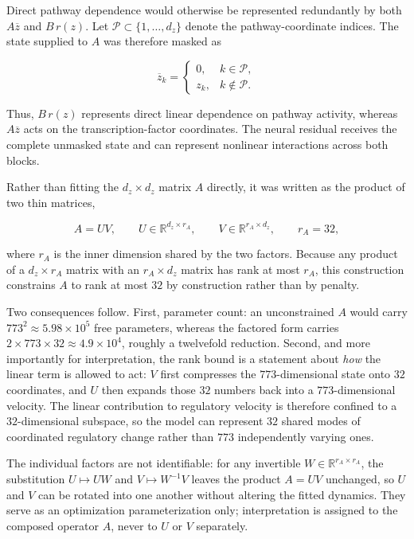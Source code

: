 Direct pathway dependence would otherwise be represented redundantly by both
\(A\overline{z}\) and \(B\,r(z)\). Let
\(\mathcal{P}\subset\{1,\ldots,d_z\}\) denote the pathway-coordinate indices.
The state supplied to \(A\) was therefore masked as

\begin{equation}
\overline{z}_k
=
\begin{cases}
0, & k\in\mathcal{P},\\
z_k, & k\notin\mathcal{P}.
\end{cases}
\label{eq:methods-pathway-mask}
\end{equation}

Thus, \(B\,r(z)\) represents direct linear dependence on pathway activity, whereas \(A\overline{z}\) acts on the transcription-factor coordinates. The neural residual receives the complete unmasked state and can represent nonlinear interactions across both blocks.

Rather than fitting the \(d_z\times d_z\) matrix \(A\) directly, it was
written as the product of two thin matrices,

\begin{equation}
A=UV,
\qquad
U\in\mathbb{R}^{d_z\times r_A},
\qquad
V\in\mathbb{R}^{r_A\times d_z},
\qquad
r_A=32,
\label{eq:methods-low-rank-a}
\end{equation}

where \(r_A\) is the inner dimension shared by the two factors. Because any
product of a \(d_z\times r_A\) matrix with an \(r_A\times d_z\) matrix has rank
at most \(r_A\), this construction constrains \(A\) to rank at most \(32\)
by construction rather than by penalty.

Two consequences follow. First, parameter count: an unconstrained \(A\) would
carry \(773^2\approx 5.98\times10^5\) free parameters, whereas the factored form
carries \(2\times773\times32\approx4.9\times10^4\), roughly a twelvefold
reduction. Second, and more importantly for interpretation, the rank bound is a
statement about \emph{how} the linear term is allowed to act: \(V\) first
compresses the \(773\)-dimensional state onto \(32\) coordinates, and \(U\) then
expands those \(32\) numbers back into a \(773\)-dimensional velocity. The
linear contribution to regulatory velocity is therefore confined to a
\(32\)-dimensional subspace, so the model can represent \(32\) shared modes of
coordinated regulatory change rather than \(773\) independently varying ones.

The individual factors are not identifiable: for any invertible
\(W\in\mathbb{R}^{r_A\times r_A}\), the substitution
\(U\mapsto UW\) and \(V\mapsto W^{-1}V\) leaves the product \(A=UV\) unchanged,
so \(U\) and \(V\) can be rotated into one another without altering the fitted
dynamics. They serve as an optimization parameterization only; interpretation is
assigned to the composed operator \(A\), never to \(U\) or \(V\) separately.

